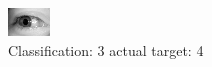 \begin{figure}[h!]
\begin{center}
\includegraphics[width=0.60\columnwidth]{figures/ID3125_class_3_target_4.png}
\end{center}
\caption{ Classification: 3 actual target: 4}
\label{fig:ID3125_class_3_target_4}
\end{figure}
